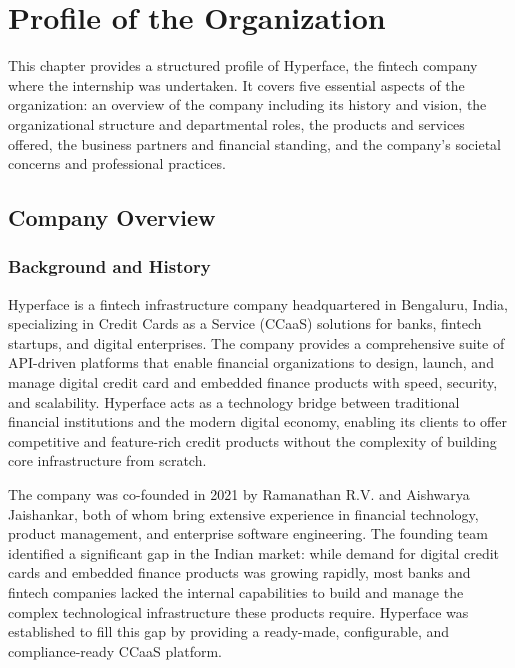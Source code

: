 \chapter{Profile of the Organization}

This chapter provides a structured profile of Hyperface, the fintech company where the internship was undertaken. It covers five essential aspects of the organization: an overview of the company including its history and vision, the organizational structure and departmental roles, the products and services offered, the business partners and financial standing, and the company's societal concerns and professional practices.

\section{Company Overview}

\subsection{Background and History}

Hyperface is a fintech infrastructure company headquartered in Bengaluru, India, specializing in Credit Cards as a Service (CCaaS) solutions for banks, fintech startups, and digital enterprises. The company provides a comprehensive suite of API-driven platforms that enable financial organizations to design, launch, and manage digital credit card and embedded finance products with speed, security, and scalability. Hyperface acts as a technology bridge between traditional financial institutions and the modern digital economy, enabling its clients to offer competitive and feature-rich credit products without the complexity of building core infrastructure from scratch.

The company was co-founded in 2021 by Ramanathan R.V. and Aishwarya Jaishankar, both of whom bring extensive experience in financial technology, product management, and enterprise software engineering. The founding team identified a significant gap in the Indian market: while demand for digital credit cards and embedded finance products was growing rapidly, most banks and fintech companies lacked the internal capabilities to build and manage the complex technological infrastructure these products require. Hyperface was established to fill this gap by providing a ready-made, configurable, and compliance-ready CCaaS platform.

